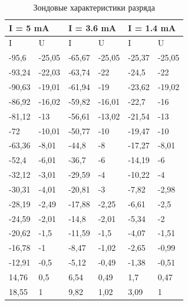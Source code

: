 \documentclass[a4paper,12pt]{article}
\begin{document}
		\begin{table}[h]
			\centering
			\caption{Зондовые характеристики разряда}
			\label{my-label}
			\begin{tabular}{|l|l|l|l|l|l|}
				\hline
				\multicolumn{2}{|l|}{I = 5 mA} & \multicolumn{2}{l|}{I = 3.6 mA} & \multicolumn{2}{l|}{I = 1.4 mA} \\ \hline
				I          & U         & I         & U         & I         & U         \\ \hline
				-95,6      & -25,05    & -65,67    & -25,05    & -25,37    & -25,05    \\ \hline
				-93,24     & -22,03    & -63,74    & -22       & -24,5     & -22       \\ \hline
				-90,63     & -19,01    & -61,94    & -19       & -23,62    & -19,02    \\ \hline
				-86,92     & -16,02    & -59,82    & -16,01    & -22,7     & -16       \\ \hline
				-81,12     & -13       & -56,61    & -13,02    & -21,54    & -13       \\ \hline
				-72        & -10,01    & -50,77    & -10       & -19,47    & -10       \\ \hline
				-63,36     & -8,01     & -44,8     & -8        & -17,27    & -8,01     \\ \hline
				-52,4      & -6,01     & -36,7     & -6        & -14,19    & -6        \\ \hline
				-32,12     & -3,01     & -29,59    & -4        & -10,22    & -4        \\ \hline
				-30,31     & -4,01     & -20,81    & -3        & -7,82     & -2,98     \\ \hline
				-28,19     & -2,49     & -17,88    & -2,25     & -6,61     & -2,5      \\ \hline
				-24,59     & -2,01     & -14,8     & -2,01     & -5,34     & -2        \\ \hline
				-20,62     & -1,5      & -11,59    & -1,5      & -4,07     & -1,51     \\ \hline
				-16,78     & -1        & -8,47     & -1,02     & -2,65     & -0,99     \\ \hline
				-12,91     & -0,5      & -5,12     & -0,49     & -1,38     & -0,51     \\ \hline
				14,76      & 0,5       & 6,54      & 0,49      & 1,7       & 0,47      \\ \hline
				18,55      & 1         & 9,82      & 1,02      & 3,09      & 1         \\ \hline

\end{tabular}
\end{table}
\end{document}
